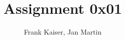 \documentclass{article}
\begin{document}
\title{Assignment 0x01}
\author{Frank Kaiser, Jan Martin}

\maketitle







\end{document}
